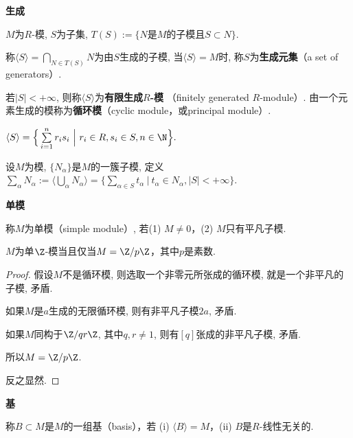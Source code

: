 	\begin{definition} \textbf{生成}\par
		$M$为$R$-模, $S$为子集, $T(S):=\{N$是$M$的子模且$S\subset N\}$.\par
		称$\langle S\rangle=\bigcap\limits_{N\in T(S)} N$为由$S$生成的子模, 
        当$\langle S\rangle=M$时, 称$S$为\textbf{生成元集}（a set of generators）.\par
		若$|S|<+\infty$, 则称$\langle S\rangle$为\textbf{有限生成$R$-模}
        （finitely generated $R$-module）.  
        由一个元素生成的模称为\textbf{循环模}（cyclic module，或principal module）.
	\end{definition}
		
	\begin{proposition}
		$\langle S\rangle=\Big\{\sum\limits_{i=1}^{n} r_i s_i\ \Big|\ r_i\in R, s_i\in S, n\in \N \Big\}.$
	\end{proposition}	
		
	\begin{definition} 
		设$M$为模, $\{N_\alpha\}$是$M$的一簇子模, 
        定义$\sum\limits_\alpha N_\alpha
        :=\big\langle\bigcup\limits_\alpha N_\alpha\big\rangle
        =\Big\{\sum\limits_{\alpha\in S}t_{\alpha}\ \Big|\ 
        t_{\alpha}\in N_{\alpha},|S|<+\infty\Big\}$.
	\end{definition}
		
	\begin{definition} \textbf{单模}\par
		称$M$为单模（simple module）, 若(1) $M\neq 0$，(2) $M$只有平凡子模.
	\end{definition}
	
	\begin{proposition} 
		$M$为单$\Z$-模当且仅当$M=\Z/p\Z$，其中$p$是素数.
	\end{proposition}	

    \begin{proof}
        假设$M$不是循环模, 则选取一个非零元所张成的循环模, 就是一个非平凡的子模, 矛盾.

        如果$M$是$a$生成的无限循环模, 则有非平凡子模$2a$, 矛盾.

        如果$M$同构于$\Z/qr\Z$, 其中$q,r\neq1$, 则有$[q]$张成的非平凡子模, 矛盾.

        所以$M=\Z/p\Z$.

        反之显然.
    \end{proof}
	
	\begin{definition} \textbf{基}\par
		称$B\subset M$是$M$的一组基（basis），若
        (i) $\langle B\rangle=M$，(ii) $B$是$R$-线性无关的.
	\end{definition}
	
